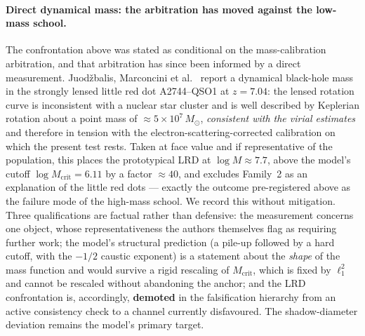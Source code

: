 \documentclass[11pt,a4paper]{article}
\theoremstyle{plain}
\theoremstyle{remark}
\begin{document}
\paragraph{Direct dynamical mass: the arbitration has moved against the low-mass school.} The confrontation above was stated as conditional on the mass-calibration arbitration, and that arbitration has since been informed by a direct measurement. Juod\v{z}balis, Marconcini et al.~\cite{juodzbalis2026} report a dynamical black-hole mass in the strongly lensed little red dot A2744--QSO1 at $z = 7.04$: the lensed rotation curve is inconsistent with a nuclear star cluster and is well described by Keplerian rotation about a point mass of $\approx 5\times10^{7}\,M_\odot$, \emph{consistent with the virial estimates} and therefore in tension with the electron-scattering-corrected calibration on which the present test rests. Taken at face value and if representative of the population, this places the prototypical LRD at $\log M \approx 7.7$, above the model's cutoff $\log M_{\text{crit}} = 6.11$ by a factor $\approx 40$, and excludes Family~2 as an explanation of the little red dots --- exactly the outcome pre-registered above as the failure mode of the high-mass school. We record this without mitigation. Three qualifications are factual rather than defensive: the measurement concerns one object, whose representativeness the authors themselves flag as requiring further work; the model's structural prediction (a pile-up followed by a hard cutoff, with the $-1/2$ caustic exponent) is a statement about the \emph{shape} of the mass function and would survive a rigid rescaling of $M_{\text{crit}}$, which is fixed by $\ell_1^2$ and cannot be rescaled without abandoning the anchor; and the LRD confrontation is, accordingly, \textbf{demoted} in the falsification hierarchy from an active consistency check to a channel currently disfavoured. The shadow-diameter deviation remains the model's primary target.
\end{document}
